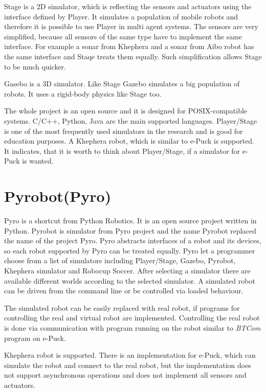 \documentclass[12pt,notitlepage]{report}
\begin{document}
	Stage is a 2D simulator, which is reflecting the sensors and actuators using the interface defined by Player.
	It simulates a population of mobile robots and therefore it is possible to use Player 
	in multi agent systems.
	The sensors are very simplified, because all sensors of the same type 
	have to implement the same interface. For example a sonar from Khephera and a sonar from Aibo robot
	has the same interface and Staqe treats them equally. 
	Such simplification allows Stage to be much quicker.
	
	Gasebo is a 3D simulator. Like Stage Gazebo simulates a big population of robots.
	It uses a rigid-body physics like Stage too.
	
	The whole project is an open source and it is designed for POSIX-compatible systems.
	C/C++, Python, Java are the main supported languages.
	Player/Stage is one of the most frequently used simulators in the research and is good for education purposes.
	A Khephera robot, which is similar to e-Puck is supported.
	It indicates, that it is worth to think about Player/Stage, if a simulator for e-Puck is wanted.
\section{Pyrobot(Pyro)\cite{pyro}}
	
	Pyro is a shortcut from Python Robotics. It is an open source project written in Python. Pyrobot is simulator
	from Pyro project and the name Pyrobot replaced the name of the project Pyro. 
	Pyro abstracts interfaces of a robot and
	its devices, so each robot supported by Pyro can be treated equally.
	Pyro let a programmer choose from a list of simulators including Player/Stage, Gazebo, Pyrobot, Khephera simulator
	and Robocup Soccer.
	After selecting a simulator there are available different worlds according to the selected simulator.
	A simulated robot can be driven from the command line or be controlled via loaded behaviour.
	
	The simulated robot can be easily replaced with real robot, if programs for controlling the real 
	and virtual robot are implemented. 	
	Controlling the real robot is done via communication with program running on the robot similar 
	to {\it BTCom} program on e-Puck.
	
	Khephera robot is supported. There is an implementation for e-Puck, which can simulate the robot
	and connect to the real robot, but the implementation does not support asynchronous operations and does 
	not implement all sensors and actuators.
	
\end{document}
